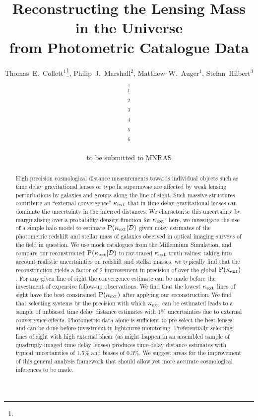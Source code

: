 \documentclass[useAMS,usenatbib]{mn2e}
\title[Line of Sight Mass Reconstruction]
{Reconstructing the Lensing Mass in the Universe \\
from Photometric Catalogue Data}
\author[Collett \etal]{%
  Thomas~E.~Collett$^{1}$\thanks{\collettemail},
  Philip~J.~Marshall$^{2}$,
  Matthew~W.~Auger$^{1}$,
  Stefan~Hilbert$^{3}$,
\newauthor{%
  Sherry~H.~Suyu$^{4}$,
  Zachary~Greene$^{4}$,
  Tommaso~Treu$^{4}$\thanks{\packard},}
\newauthor{%
  Christopher~D.~Fassnacht$^{5}$,
  L\'eon~V.~E.~Koopmans$^{6}$,
  Roger~D.~Blandford$^{3}$} 
  \medskip\\
  $^1$\ioa\\
  $^2$\oxford\\
  $^3$\kipac\\
  $^4$\ucsb\\
  $^5$\davis\\
  $^6$\kapteyn
}
\begin{document}
             
\date{to be submitted to MNRAS}
\pagerange{\pageref{firstpage}--\pageref{lastpage}}

\maketitle           

\label{firstpage}


\begin{abstract} 

High precision cosmological distance measurements towards individual objects
such as time delay gravitational lenses or type Ia supernovae are affected by
weak lensing perturbations by galaxies and groups along the line of sight.
Such massive structures contribute an ``external convergence'' $\kappa_{\rm ext}$ that
in time delay gravitational lenses can dominate the uncertainty in the inferred distances.  We
characterise this uncertainty by marginalising over a probability density
function for $\kappa_{\rm ext}$: here, we investigate the use of a simple halo model to
estimate ${\rm P}(\kappa_{\rm ext}|{\mathcal{D}})$ given noisy estimates of the photometric redshift
and stellar mass of galaxies observed in optical imaging surveys of the field
in question. We use mock catalogues from the Millennium Simulation, and compare
our reconstructed ${\rm P}(\kappa_{\rm ext}|{\mathcal{D}})$ to ray-traced $\kappa_{\rm ext}$ truth values: 
taking into account realistic uncertainties on redshift and stellar masses, we
typically find that the reconstruction yields a factor of 2 improvement in precision of
over the global ${\rm P}(\kappa_{\rm ext})$. For any given line of sight the
convergence estimate can be made before the investment of expensive follow-up
observations. We find that the lowest $\kappa_{\rm ext}$ lines of sight have the best constrained 
${\rm P}(\kappa_{\rm ext})$ after applying our reconstruction. We find that selecting systems by the precision with which
$\kappa_{\rm ext}$ can be estimated leads to a sample of unbiased
time delay distance estimates with 1\% uncertainties due to external convergence effects.
Photometric data alone is sufficient to pre-select the best lenses and can be done
before investment in lightcurve monitoring. Preferentially selecting lines of
sight with high external shear (as might happen in an assembled sample of
quadruply-imaged time delay lenses) produces time-delay distance estimates with
typical uncertainties of 1.5\% and biases of 0.3\%. We suggest areas for the improvement of this general
analysis framework that should allow yet more accurate cosmological inferences
to be made.

\end{abstract}
\end{document}
